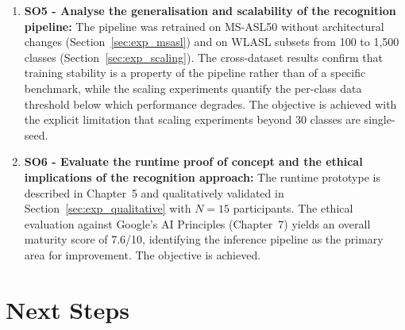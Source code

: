 \begin{enumerate}
    \item \textbf{SO5 - Analyse the generalisation and scalability of the recognition pipeline:}
          The pipeline was retrained on MS-ASL50 without architectural changes
          (Section~\ref{sec:exp_msasl}) and on WLASL subsets from 100 to 1{,}500 classes
          (Section~\ref{sec:exp_scaling}). The cross-dataset results confirm that training stability is a
          property of the pipeline rather than of a specific benchmark, while the scaling experiments
          quantify the per-class data threshold below which performance degrades. The objective is
          achieved with the explicit limitation that scaling experiments beyond 30 classes are
          single-seed.

    \item \textbf{SO6 - Evaluate the runtime proof of concept and the ethical implications of the
              recognition approach:} The runtime prototype is described in Chapter~5 and qualitatively
          validated in Section~\ref{sec:exp_qualitative} with $N=15$ participants. The ethical evaluation
          against Google's AI Principles (Chapter~7) yields an overall maturity score of 7.6/10,
          identifying the inference pipeline as the primary area for improvement. The objective is
          achieved.
\end{enumerate}

\section{Next Steps}

